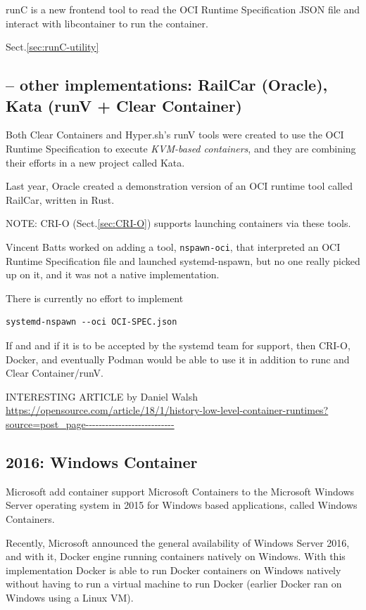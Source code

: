 runC is a new frontend tool to read the OCI Runtime Specification JSON file and
interact with libcontainer to run the container.
 
Sect.\ref{sec:runC-utility}


\subsection{-- other implementations: RailCar (Oracle), Kata (runV + Clear Container)}
\label{sec:RailCar}
\label{sec:runV}
\label{sec:Kata-containers}

Both Clear Containers and Hyper.sh's runV tools were created to use the OCI
Runtime Specification to execute {\it KVM-based containers}, and they are
combining their efforts in a new project called Kata.

Last year, Oracle created a demonstration version of an OCI runtime tool called
RailCar, written in Rust.

NOTE: CRI-O (Sect.\ref{sec:CRI-O}) supports launching containers via these tools.

Vincent Batts worked on adding a tool, \verb!nspawn-oci!, that interpreted an OCI
Runtime Specification file and launched systemd-nspawn, but no one really picked
up on it, and it was not a native implementation.

There is currently no effort to implement
\begin{verbatim}
systemd-nspawn --oci OCI-SPEC.json
\end{verbatim}
If and and if it is to be  accepted by the systemd team for support, then CRI-O, Docker, and
eventually Podman would be able to use it in addition to runc and Clear
Container/runV.

INTERESTING ARTICLE by Daniel Walsh 
\url{https://opensource.com/article/18/1/history-low-level-container-runtimes?source=post_page---------------------------}



\subsection{2016: Windows Container}

Microsoft add container support Microsoft Containers to the Microsoft Windows Server
operating system in 2015 for Windows based applications, called Windows
Containers.

Recently, Microsoft announced the general availability of Windows Server 2016,
and with it, Docker engine running containers natively on Windows.
With this implementation Docker is able to run Docker containers on Windows
natively without having to run a virtual machine to run Docker (earlier Docker
ran on Windows using a Linux VM).

